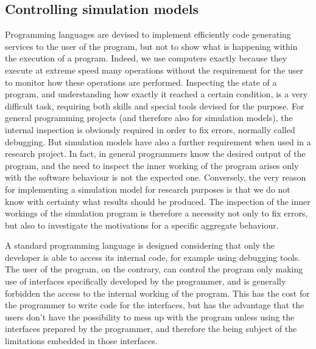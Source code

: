 \documentclass [11pt,a4paper] {book}
\begin{document}
\subsection{Controlling simulation models}

Programming languages are devised to implement efficiently code generating services to the user of the program, but not to show what is happening within the execution of a program. Indeed, we use computers exactly because they execute at extreme speed many operations without the requirement for the user to monitor how these operations are performed. Inspecting the state of a program, and understanding how exactly it reached a certain condition, is a very difficult task, requiring both skills and special tools devised for the purpose. For general programming projects (and therefore also for simulation models), the internal inspection is obviously required in order to fix errors, normally called debugging. But simulation models have also a further requirement when used in a research project. In fact, in general programmers know the desired output of the program, and the need to inspect the inner working of the program arises only with the software behaviour is not the expected one. Conversely, the very reason for implementing a simulation model for research purposes is that we do not know with certainty what results should be produced. The inspection of the inner workings of the simulation program is therefore a necessity not only to fix errors, but also to investigate the motivations for a specific aggregate behaviour.

A standard programming language is designed considering that only the developer is able to access its internal code, for example using debugging tools. The user of the program, on the contrary, can control the program only making use of interfaces specifically developed by the programmer, and is generally forbidden the access to the internal working of the program. This has the cost for the programmer to write code for the interfaces, but has the advantage that the users don't have the possibility to mess up with the program unless using the interfaces prepared by the programmer, and therefore the being subject of the limitations embedded in those interfaces.
\end{document}
